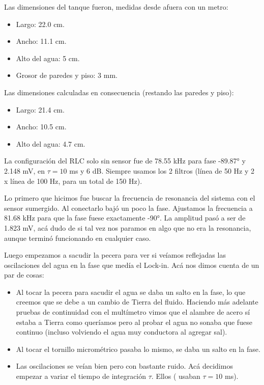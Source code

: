 Las dimensiones del tanque fueron, medidas desde afuera con un metro: 
\begin{itemize}
	\item Largo: 22.0 cm.
	\item Ancho: 11.1 cm.
	\item Alto del agua: 5 cm.
	\item Grosor de paredes y piso: 3 mm.
\end{itemize}

Las dimensiones calculadas en consecuencia (restando las paredes y piso): 
\begin{itemize}
	\item Largo: 21.4 cm.
	\item Ancho: 10.5 cm.
	\item Alto del agua: 4.7 cm.
\end{itemize}

La configuración del RLC solo sin sensor fue de 78.55 kHz para fase -89.87° y 2.148 mV, en $\tau=10$ ms y 6 dB. Siempre usamos los 2 filtros (línea de 50 Hz y 2 x línea de 100 Hz, para un total de 150 Hz). 

Lo primero que hicimos fue buscar la frecuencia de resonancia del sistema con el sensor sumergido. Al conectarlo bajó un poco la fase. Ajustamos la frecuencia a 81.68 kHz para que la fase fuese exactamente -90°. La amplitud pasó a ser de 1.823 mV, acá dudo de si tal vez nos paramos en algo que no era la resonancia, aunque terminó funcionando en cualquier caso.

Luego empezamos a sacudir la pecera para ver si veíamos reflejadas las oscilaciones del agua en la fase que medía el Lock-in. Acá nos dimos cuenta de un par de cosas:
\begin{itemize}
	\item Al tocar la pecera para sacudir el agua se daba un salto en la fase, lo que creemos que se debe a un cambio de Tierra del fluido. Haciendo más adelante pruebas de continuidad con el multímetro vimos que el alambre de acero sí estaba a Tierra como queríamos pero al probar el agua no sonaba que fuese continuo (incluso volviendo el agua muy conductora al agregar sal). 
	\item Al tocar el tornillo micrométrico pasaba lo mismo, se daba un salto en la fase.
	\item Las oscilaciones se veían bien pero con bastante ruido. Acá decidimos empezar a variar el tiempo de integración $\tau$. Ellos (\cite{gordillozavaletaNonpropagatingHydrodynamicSolitons2012} usaban $\tau=10$ ms). 
\end{itemize}

